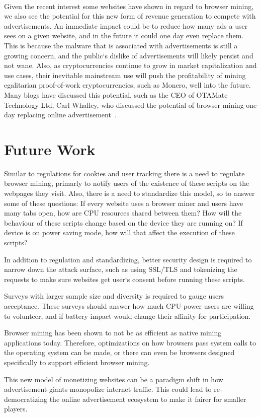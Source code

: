 \\
Given the recent interest some websites have shown in regard to browser mining, we also see the potential for this new form of revenue generation to compete with advertisements. An immediate impact could be to reduce how many ads a user sees on a given website, and in the future it could one day even replace them. This is because the malware that is associated with advertisements is still a growing concern, and the public`s dislike of advertisements will likely persist and not wane. Also, as cryptocurrencies continue to grow in market capitalization and use cases, their inevitable mainstream use will push the profitability of mining egalitarian proof-of-work cryptocurrencies, such as Monero, well into the future. Many blogs have discussed this potential, such as the CEO of OTAMate Technology Ltd, Carl Whalley, who discussed the potential of browser mining one day replacing online advertisement~\cite{carlcryptoads}.

\section{Future Work}

Similar to regulations for cookies and user tracking there is a need to regulate browser mining, primarly to notify users of the existence of these scripts on the webpages they visit. Also, there is a need to standardize this model, so to answer some of these questions: If every website uses a browser miner and users have many tabs open, how are CPU resources shared between them? How will the behaviour of these scripts change based on the device they are running on? If device is on power saving mode, how will that affect the execution of these scripts?

In addition to regulation and standardizing, better security design is required to narrow down the attack surface, such as using SSL/TLS and tokenizing the requests to make sure websites get user`s consent before running these scripts. 

Surveys with larger sample size and diversity is required to gauge users acceptance. These surveys should answer how much CPU power users are willing to volunteer, and if battery impact would change their affinity for participation.

Browser mining has been shown to not be as efficient as native mining applications today. Therefore, optimizations on how browsers pass system calls to the operating system can be made, or there can even be browsers designed specifically to support efficient browser mining.

This new model of monetizing websites can be a paradigm shift in how advertisement giants monopolize internet traffic. This could lead to re-democratizing the online advertisement ecosystem to make it fairer for smaller players.


